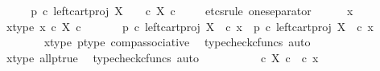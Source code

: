 \begin{isabellebody}
%
\isadelimproof
%
\endisadelimproof
%
\isatagproof
{}\isamarkupfalse%
\ {\isacharminus}{\kern0pt}\isanewline
\ \ \isamarkupfalse%
\ {\isachardoublequoteopen}p\ {\isasymcirc}\isactrlsub c\ left{\isacharunderscore}{\kern0pt}cart{\isacharunderscore}{\kern0pt}proj\ X\ {\isasymone}\ {\isacharequal}{\kern0pt}\ {\isasymt}\ {\isasymcirc}\isactrlsub c\ {\isasymbeta}\isactrlbsub X\ {\isasymtimes}\isactrlsub c\ {\isasymone}\isactrlesub {\isachardoublequoteclose}\isanewline
\ \ \isamarkupfalse%
\ {\isacharparenleft}{\kern0pt}etcs{\isacharunderscore}{\kern0pt}rule\ one{\isacharunderscore}{\kern0pt}separator{\isacharparenright}{\kern0pt}\isanewline
\ \ \ \ \isamarkupfalse%
\ x\isanewline
\ \ \ \ \isamarkupfalse%
\ x{\isacharunderscore}{\kern0pt}type{\isacharcolon}{\kern0pt}\ {\isachardoublequoteopen}x\ {\isasymin}\isactrlsub c\ X\ {\isasymtimes}\isactrlsub c\ {\isasymone}{\isachardoublequoteclose}\isanewline
\isanewline
\ \ \ \ \isamarkupfalse%
\ {\isachardoublequoteopen}{\isacharparenleft}{\kern0pt}p\ {\isasymcirc}\isactrlsub c\ left{\isacharunderscore}{\kern0pt}cart{\isacharunderscore}{\kern0pt}proj\ X\ {\isasymone}{\isacharparenright}{\kern0pt}\ {\isasymcirc}\isactrlsub c\ x\ {\isacharequal}{\kern0pt}\ p\ {\isasymcirc}\isactrlsub c\ {\isacharparenleft}{\kern0pt}left{\isacharunderscore}{\kern0pt}cart{\isacharunderscore}{\kern0pt}proj\ X\ {\isasymone}\ {\isasymcirc}\isactrlsub c\ x{\isacharparenright}{\kern0pt}{\isachardoublequoteclose}\isanewline
\ \ \ \ \ \ \isamarkupfalse%
\ x{\isacharunderscore}{\kern0pt}type\ p{\isacharunderscore}{\kern0pt}type\ comp{\isacharunderscore}{\kern0pt}associative{}\ \isamarkupfalse%
\ {\isacharparenleft}{\kern0pt}typecheck{\isacharunderscore}{\kern0pt}cfuncs{\isacharcomma}{\kern0pt}\ auto{\isacharparenright}{\kern0pt}\isanewline
\ \ \ \ \isamarkupfalse%
\ \isamarkupfalse%
\ {\isachardoublequoteopen}{\isachardot}{\kern0pt}{\isachardot}{\kern0pt}{\isachardot}{\kern0pt}\ {\isacharequal}{\kern0pt}\ {\isasymt}{\isachardoublequoteclose}\isanewline
\ \ \ \ \ \ \isamarkupfalse%
\ x{\isacharunderscore}{\kern0pt}type\ all{\isacharunderscore}{\kern0pt}p{\isacharunderscore}{\kern0pt}true\ \isamarkupfalse%
\ {\isacharparenleft}{\kern0pt}typecheck{\isacharunderscore}{\kern0pt}cfuncs{\isacharcomma}{\kern0pt}\ auto{\isacharparenright}{\kern0pt}\isanewline
\ \ \ \ \isamarkupfalse%
\ \isamarkupfalse%
\ {\isachardoublequoteopen}{\isachardot}{\kern0pt}{\isachardot}{\kern0pt}{\isachardot}{\kern0pt}\ {\isacharequal}{\kern0pt}\ {\isasymt}\ {\isasymcirc}\isactrlsub c\ {\isasymbeta}\isactrlbsub X\ {\isasymtimes}\isactrlsub c\ {\isasymone}\isactrlesub \ {\isasymcirc}\isactrlsub c\ x\ {\isachardoublequoteclose}\isanewline

\end{isabellebody}
